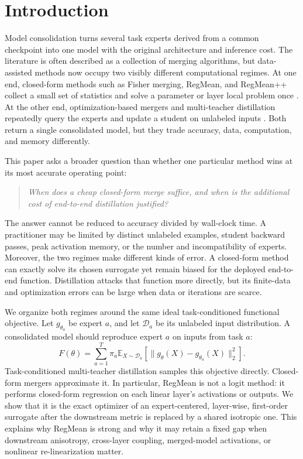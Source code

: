 \documentclass[letterpaper]{article} %
\theoremstyle{plain}
\theoremstyle{definition}
\begin{document}
\section{Introduction}
\label{sec:intro}

Model consolidation turns several task experts derived from a common checkpoint into one
model with the original architecture and inference cost. The literature is often described
as a collection of merging algorithms, but data-assisted methods now occupy two visibly
different computational regimes. At one end, closed-form methods such as Fisher merging,
RegMean, and RegMean++ collect a small set of statistics and solve a parameter or
layer local problem once \citep{matena2022fisher,jin2023regmean,regmeanplusplus2025}. At
the other end, optimization-based mergers and multi-teacher distillation repeatedly query
the experts and update a student on unlabeled inputs
\citep{yang2024adamerging,prodistill2025,samerging2025}. Both return a single consolidated
model, but they trade accuracy, data, computation, and memory differently.

This paper asks a broader question than whether one particular method wins at its most
accurate operating point:
\begin{quote}
\emph{When does a cheap closed-form merge suffice, and when is the additional cost of
end-to-end distillation justified?}
\end{quote}
The answer cannot be reduced to accuracy divided by wall-clock time. A practitioner may be
limited by distinct unlabeled examples, student backward passes, peak activation memory, or
the number and incompatibility of experts. Moreover, the two regimes make different kinds
of error. A closed-form method can exactly solve its chosen surrogate yet remain biased for
the deployed end-to-end function. Distillation attacks that function more directly, but
its finite-data and optimization errors can be large when data or iterations are scarce.

We organize both regimes around the same ideal task-conditioned functional objective. Let
$g_{\theta_a}$ be expert $a$, and let $\mathcal D_a$ be its unlabeled input distribution.
A consolidated model should reproduce expert $a$ on inputs from task $a$:
\begin{equation}
F(\theta)=\sum_{a=1}^{T}\pi_a
\mathbb E_{X\sim\mathcal D_a}
\left[\|g_\theta(X)-g_{\theta_a}(X)\|_2^2\right].
\label{eq:functional-objective}
\end{equation}
Task-conditioned multi-teacher distillation samples this objective directly. Closed-form
mergers approximate it. In particular, RegMean is not a logit method: it performs
closed-form regression on each linear layer's activations or outputs. We show that it is
the exact optimizer of an expert-centered, layer-wise, first-order surrogate after the
downstream metric is replaced by a shared isotropic one. This explains why RegMean is
strong and why it may retain a fixed gap when downstream anisotropy, cross-layer coupling,
merged-model activations, or nonlinear re-linearization matter.
\end{document}
